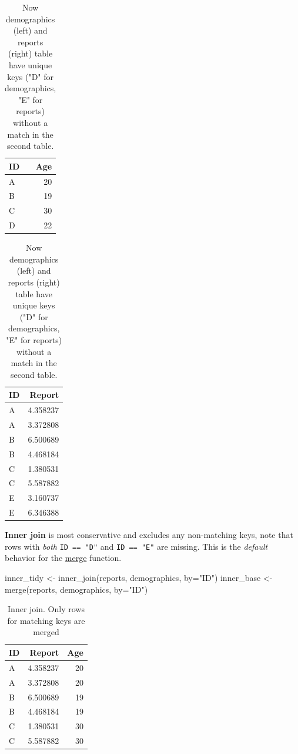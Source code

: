 \documentclass[
]{book}
\newenvironment{Shaded}{\begin{snugshade}}{\end{snugshade}}
\newcommand{\AttributeTok}[1]{\textcolor[rgb]{0.77,0.63,0.00}{#1}}
\newcommand{\FunctionTok}[1]{\textcolor[rgb]{0.00,0.00,0.00}{#1}}
\newcommand{\NormalTok}[1]{#1}
\newcommand{\OtherTok}[1]{\textcolor[rgb]{0.56,0.35,0.01}{#1}}
\newcommand{\StringTok}[1]{\textcolor[rgb]{0.31,0.60,0.02}{#1}}
\begin{document}
\begin{table}
\caption{\label{tab:unnamed-chunk-179}Now demographics (left) and reports (right) table have unique keys ("D" for demographics, "E" for reports) without a match in the second table.}

\centering
\begin{tabular}[t]{l|r}
\hline
ID & Age\\
\hline
A & 20\\
\hline
B & 19\\
\hline
C & 30\\
\hline
D & 22\\
\hline
\end{tabular}
\centering
\begin{tabular}[t]{l|r}
\hline
ID & Report\\
\hline
A & 4.358237\\
\hline
A & 3.372808\\
\hline
B & 6.500689\\
\hline
B & 4.468184\\
\hline
C & 1.380531\\
\hline
C & 5.587882\\
\hline
E & 3.160737\\
\hline
E & 6.346388\\
\hline
\end{tabular}
\end{table}

\textbf{Inner join} is most conservative and excludes any non-matching keys, note that rows with \emph{both} \texttt{ID\ ==\ "D"} and \texttt{ID\ ==\ "E"} are missing. This is the \emph{default} behavior for the \href{https://stat.ethz.ch/R-manual/R-devel/library/base/html/merge.html}{merge} function.

\begin{Shaded}
\begin{Highlighting}[]
\NormalTok{inner\_tidy }\OtherTok{\textless{}{-}} \FunctionTok{inner\_join}\NormalTok{(reports, demographics, }\AttributeTok{by=}\StringTok{"ID"}\NormalTok{) }
\NormalTok{inner\_base }\OtherTok{\textless{}{-}} \FunctionTok{merge}\NormalTok{(reports, demographics, }\AttributeTok{by=}\StringTok{"ID"}\NormalTok{)}
\end{Highlighting}
\end{Shaded}

\begin{table}

\caption{\label{tab:unnamed-chunk-181}Inner join. Only rows for matching keys are merged}
\centering
\begin{tabular}[t]{l|r|r}
\hline
ID & Report & Age\\
\hline
A & 4.358237 & 20\\
\hline
A & 3.372808 & 20\\
\hline
B & 6.500689 & 19\\
\hline
B & 4.468184 & 19\\
\hline
C & 1.380531 & 30\\
\hline
C & 5.587882 & 30\\
\hline
\end{tabular}
\end{table}
\end{document}
